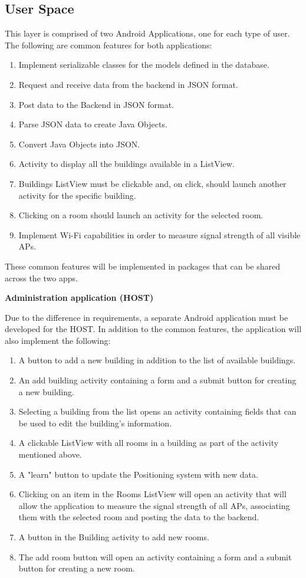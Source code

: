 \subsection{User Space}
\noindent This layer is comprised of two Android Applications, one for each type of user. The following are common features for both applications:
\begin{enumerate}
\item Implement serializable classes for the models defined in the database.
\item Request and receive data from the backend in JSON format.
\item Post data to the Backend in JSON format.
\item Parse JSON data to create Java Objects.
\item Convert Java Objects into JSON.
\item Activity to display all the buildings available in a ListView.
\item Buildings ListView must be clickable and, on click, should launch another activity for the specific building.
\item Clicking on a room should launch an activity for the selected room.
\item Implement Wi-Fi capabilities in order to measure signal strength of all visible APs.
\end{enumerate}
These common features will be implemented in packages that can be shared across the two apps.

\noindent \textbf{Administration application (HOST)}

Due to the difference in requirements, a separate Android application must be developed for the HOST. In addition to the common features, the application will also implement the following:
\begin{enumerate}
\item A button to add a new building in addition to the list of available buildings.
\item An add building activity containing a form and a submit button for creating a new building.
\item Selecting a building from the list opens an activity containing fields that can be used to edit the building’s information.
\item A clickable ListView with all rooms in a building as part of the activity mentioned above.
\item A "learn" button to update the Positioning system with new data.
\item Clicking on an item in the Rooms ListView will open an activity that will allow the application to measure the signal strength of all APs, associating them with the selected room and posting the data to the backend.
\item A button in the Building activity to add new rooms.
\item The add room button will open an activity containing a form and a submit button for creating a new room.
\end{enumerate}


